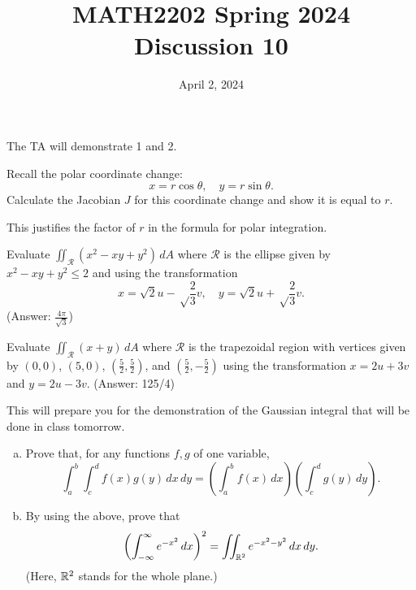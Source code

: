 \documentclass[11pt,oneside]{amsart}
\title{MATH2202 Spring 2024\\
Discussion 10}
\date{April 2, 2024}
\theoremstyle{definition}
\begin{document}
  \maketitle

  The TA will demonstrate 1 and 2.

  \begin{problem}
    Recall the polar coordinate change:
    \[x=r\cos\theta,\quad y=r\sin\theta.\]
    Calculate the Jacobian $J$ for this coordinate change and show it is equal to $r$.

    This justifies the factor of $r$ in the formula for polar integration.
  \end{problem}

  \begin{problem}
    Evaluate $\iint_{\mathcal R}(x^2-xy+y^2)\,dA$ where $\mathcal R$ is the ellipse given by $x^2-xy+y^2\leq 2$ and using the transformation
    \[x=\sqrt2u-\sqrt\frac23v,\quad y=\sqrt2u+\sqrt\frac23v.\]
    (Answer: $\frac{4\pi}{\sqrt3}$)
  \end{problem}

  \begin{problem}
    Evaluate $\iint_{\mathcal R}(x+y)\,dA$ where $\mathcal R$ is the trapezoidal region with vertices given by $(0,0)$, $(5,0)$, $\left(\frac52,\frac52\right)$, and $\left(\frac52,-\frac52\right)$ using the transformation $x=2u+3v$ and $y=2u-3v$. (Answer: 125/4)
  \end{problem}

  \begin{problem}
    This will prepare you for the demonstration of the Gaussian integral that will be done in class tomorrow.
    \begin{enumerate}[(a)]
      \item Prove that, for any functions $f,g$ of one variable,
      \[\int_a^b\int_c^df(x)g(y)\,dx\,dy=\left(\int_a^bf(x)\,dx\right)\left(\int_c^dg(y)\,dy\right).\]
      \item By using the above, prove that
      \[\left(\int_{-\infty}^\infty e^{-x^2}\,dx\right)^2=\iint_{\mathbb R^2}e^{-x^2-y^2}\,dx\,dy.\]
      (Here, $\mathbb R^2$ stands for the whole plane.)
    \end{enumerate}


  \end{problem}
\end{document}
